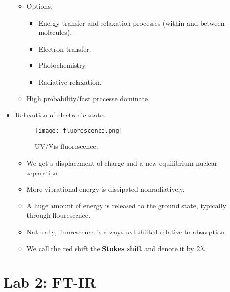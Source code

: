 \documentclass[../notes.tex]{subfiles}
\begin{document}
\begin{itemize}
\begin{itemize}
        \item Options.
        \begin{itemize}
            \item Energy transfer and relaxation processes (within and between molecules).
            \item Electron transfer.
            \item Photochemistry.
            \item Radiative relaxation.
        \end{itemize}
        \item High probability/fast processe dominate.
    \end{itemize}
    \item Relaxation of electronic states.
    \begin{figure}[h!]
        \centering
        \texttt{[image: fluorescence.png]}
        \caption{UV/Vis fluorescence.}
        \label{fig:fluorescence}
    \end{figure}
    \begin{itemize}
        \item We get a displacement of charge and a new equilibrium nuclear separation.
        \item More vibrational energy is dissipated nonradiatively.
        \item A huge amount of energy is released to the ground state, typically through flourescence.
        \item Naturally, fluorescence is always red-shifted relative to absorption.
        \item We call the red shift the \textbf{Stokes shift} and denote it by $2\lambda$.
    \end{itemize}
\end{itemize}



\section{Lab 2: FT-IR}
\end{document}

